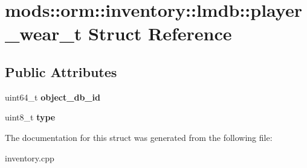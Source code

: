 \hypertarget{structmods_1_1orm_1_1inventory_1_1lmdb_1_1player__wear__t}{}\section{mods\+:\+:orm\+:\+:inventory\+:\+:lmdb\+:\+:player\+\_\+wear\+\_\+t Struct Reference}
\label{structmods_1_1orm_1_1inventory_1_1lmdb_1_1player__wear__t}
\subsection*{Public Attributes}
\begin{DoxyCompactItemize}
\item 
\mbox{\label{structmods_1_1orm_1_1inventory_1_1lmdb_1_1player__wear__t_adca306c1e830d4495c5cdd7606dd5281}} 
uint64\+\_\+t {\bfseries object\+\_\+db\+\_\+id}
\item 
\mbox{\label{structmods_1_1orm_1_1inventory_1_1lmdb_1_1player__wear__t_a3ea21a4707cc01be2c38ab9e0afb3545}} 
uint8\+\_\+t {\bfseries type}
\end{DoxyCompactItemize}


The documentation for this struct was generated from the following file\+:\begin{DoxyCompactItemize}
\item 
inventory.\+cpp\end{DoxyCompactItemize}
